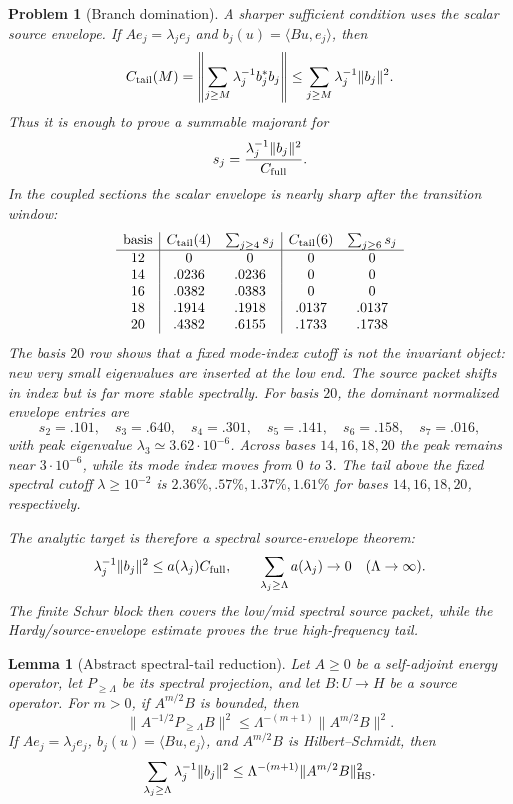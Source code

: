 \documentclass[11pt]{article}
\newtheorem{lemma}[theorem]{Lemma}
\newtheorem{problem}[theorem]{Problem}
\begin{document}
\begin{problem}[Branch domination]
A sharper sufficient condition uses the scalar source envelope.  If
\(A e_j=\lambda_j e_j\) and \(b_j(u)=\langle Bu,e_j\rangle\), then
\[
 C_{\rm tail}(M)
 =
 \left\|\sum_{j\ge M}\lambda_j^{-1}b_j^*b_j\right\|
 \le
 \sum_{j\ge M}\lambda_j^{-1}\|b_j\|^2.
\]
Thus it is enough to prove a summable majorant for
\[
  s_j={\lambda_j^{-1}\|b_j\|^2\over C_{\rm full}}.
\]
In the coupled sections the scalar envelope is nearly sharp after the
transition window:
\[
\begin{array}{c|cc|cc}
{\rm basis} & C_{\rm tail}(4) & \sum_{j\ge4}s_j
& C_{\rm tail}(6) & \sum_{j\ge6}s_j\\
\hline
12 & 0      & 0      & 0      & 0\\
14 & .0236 & .0236 & 0      & 0\\
16 & .0382 & .0383 & 0      & 0\\
18 & .1914 & .1918 & .0137 & .0137\\
20 & .4382 & .6155 & .1733 & .1738
\end{array}
\]
The basis \(20\) row shows that a fixed mode-index cutoff is not the invariant
object: new very small eigenvalues are inserted at the low end.  The source
packet shifts in index but is far more stable spectrally.  For basis \(20\),
the dominant normalized envelope entries are
\[
  s_2=.101,\quad s_3=.640,\quad s_4=.301,\quad
  s_5=.141,\quad s_6=.158,\quad s_7=.016,
\]
with peak eigenvalue \(\lambda_3\simeq3.62\cdot10^{-6}\).  Across bases
\(14,16,18,20\) the peak remains near \(3\cdot10^{-6}\), while its mode index
moves from \(0\) to \(3\).  The tail above the fixed spectral cutoff
\(\lambda\ge10^{-2}\) is \(2.36\%,.57\%,1.37\%,1.61\%\) for bases
\(14,16,18,20\), respectively.

The analytic target is therefore a spectral source-envelope theorem:
\[
  \lambda_j^{-1}\|b_j\|^2\le a(\lambda_j) C_{\rm full},
  \qquad \sum_{\lambda_j\ge\Lambda}a(\lambda_j)\to0
  \quad(\Lambda\to\infty).
\]
The finite Schur block then covers the low/mid spectral source packet, while
the Hardy/source-envelope estimate proves the true high-frequency tail.
\end{problem}

\begin{lemma}[Abstract spectral-tail reduction]
Let \(A\ge0\) be a self-adjoint energy operator, let \(P_{\ge\Lambda}\) be its
spectral projection, and let \(B:U\to H\) be a source operator.  For \(m>0\),
if \(A^{m/2}B\) is bounded, then
\[
  \|A^{-1/2}P_{\ge\Lambda}B\|^2
  \le
  \Lambda^{-(m+1)}\|A^{m/2}B\|^2 .
\]
If \(A e_j=\lambda_j e_j\), \(b_j(u)=\langle Bu,e_j\rangle\), and
\(A^{m/2}B\) is Hilbert--Schmidt, then
\[
  \sum_{\lambda_j\ge\Lambda}\lambda_j^{-1}\|b_j\|^2
  \le
  \Lambda^{-(m+1)}\|A^{m/2}B\|_{\rm HS}^2 .
\]
\end{lemma}
\end{document}
